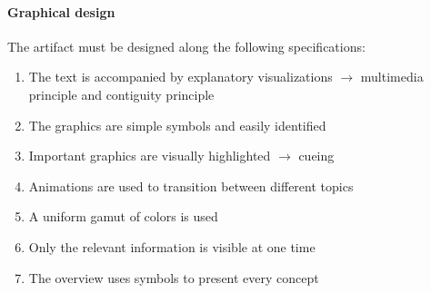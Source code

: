 \paragraph{Graphical design} The artifact must be designed along the following specifications:
\begin{enumerate}[nosep]
\setcounter{enumi}{\value{foo}}
    \item The text is accompanied by explanatory visualizations $\rightarrow$ multimedia principle and contiguity principle
    \item The graphics are simple symbols and easily identified
    \item Important graphics are visually highlighted $\rightarrow$ cueing
    \item Animations are used to transition between different topics
    \item A uniform gamut of colors is used
    \item Only the relevant information is visible at one time
    \item The overview uses symbols to present every concept
\setcounter{foo}{\value{enumi}}
\end{enumerate}

